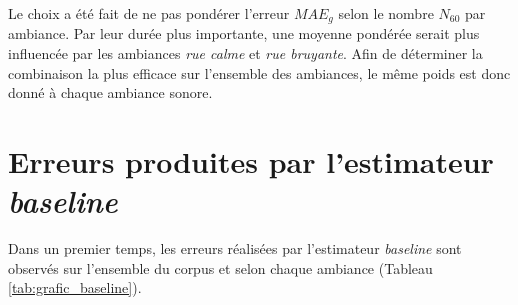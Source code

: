 Le choix a été fait de ne pas pondérer l'erreur $MAE_{g}$ selon le nombre $N_{60}$ par ambiance. Par leur durée plus importante, une moyenne pondérée serait plus influencée par les ambiances \textit{rue calme} et \textit{rue bruyante}. Afin de déterminer la combinaison la plus efficace sur l'ensemble des ambiances, le même poids est donc donné à chaque ambiance sonore.



\section{Erreurs produites par l'estimateur \textit{baseline}}
Dans un premier temps, les erreurs réalisées par l'estimateur \textit{baseline} sont observés sur l'ensemble du corpus et selon chaque ambiance (Tableau \ref{tab:grafic_baseline}).

\begin{table}[h]
\caption{Erreurs moyennes $MAE_{g}$ et $MAE_{60}$ pour l'estimateur \textit{baseline} pour le corpus d'évaluation \textit{SOUR}.}
\label{tab:grafic_baseline}
\centering
{}
\end{table}

